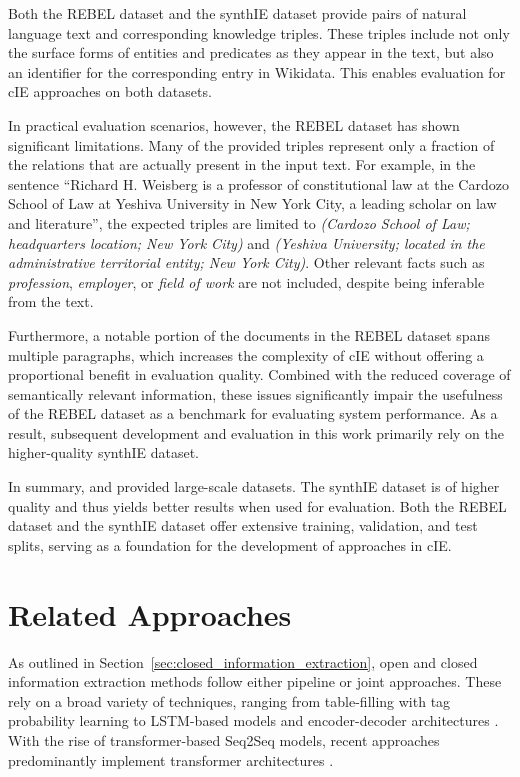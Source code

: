 \documentclass[a4paper,oneside,bibliography=totoc]{scrbook}
\begin{document}
Both the REBEL dataset and the synthIE dataset provide pairs of natural language text and corresponding knowledge triples. These triples include not only the surface forms of entities and predicates as they appear in the text, but also an identifier for the corresponding entry in Wikidata. This enables evaluation for \ac{cIE} approaches on both datasets.

In practical evaluation scenarios, however, the REBEL dataset has shown significant limitations. Many of the provided triples represent only a fraction of the relations that are actually present in the input text. For example, in the sentence \enquote{Richard H. Weisberg is a professor of constitutional law at the Cardozo School of Law at Yeshiva University in New York City, a leading scholar on law and literature}, the expected triples are limited to \textit{(Cardozo School of Law; headquarters location; New York City)} and \textit{(Yeshiva University; located in the administrative territorial entity; New York City)}. Other relevant facts such as \textit{profession}, \textit{employer}, or \textit{field of work} are not included, despite being inferable from the text.

Furthermore, a notable portion of the documents in the REBEL dataset spans multiple paragraphs, which increases the complexity of \ac{cIE} without offering a proportional benefit in evaluation quality. Combined with the reduced coverage of semantically relevant information, these issues significantly impair the usefulness of the REBEL dataset as a benchmark for evaluating system performance. As a result, subsequent development and evaluation in this work primarily rely on the higher-quality synthIE dataset.

In summary, \citet{HuguetCabot2021} and \citet{Josifoski2023} provided large-scale datasets. The synthIE dataset is of higher quality and thus yields better results when used for evaluation. Both the REBEL dataset and the synthIE dataset offer extensive training, validation, and test splits, serving as a foundation for the development of approaches in \ac{cIE}.

\section{Related Approaches}
\label{sec:related_approaches}

As outlined in Section~\ref{sec:closed_information_extraction}, open and closed information extraction methods follow either pipeline or joint approaches. These rely on a broad variety of techniques, ranging from table-filling with tag probability learning to LSTM-based models and encoder-decoder architectures \cite{Zhang2022,Angeli2015,Trisedya2019}. With the rise of transformer-based Seq2Seq models, recent approaches predominantly implement transformer architectures \cite{Josifoski2021,Josifoski2023,Moeller2024}.
\end{document}
